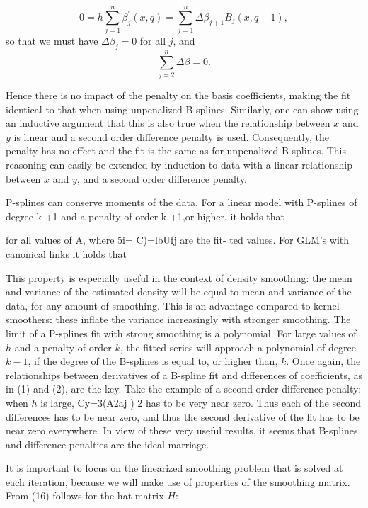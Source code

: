 \documentclass[12pt]{article}
\newcommand*\needsparaphrased{\color{red}}
\begin{document}
\[
0 = h \sum_{j=1}^n \beta^\prime_j\left(x, q\right) = \sum_{j=1}^n \Delta\beta_{j+1} B_j\left(x, q-1\right), 
\]
\noindent
so that we must have $\Delta \beta_j = 0$ for all $j$, and 
\[
\sum_{j=2}^n \Delta \beta = 0.
\]

Hence there is no impact of the penalty on the basis coefficients, making the fit identical to that when using unpenalized B-splines. Similarly, one can show using an inductive argument that this is also true when the relationship between $x$ and $y$ is linear and a second order difference penalty is used. Consequently, the penalty has no effect and the fit is the same as for unpenalized B-splines. This reasoning can easily be extended by induction to data with a linear relationship between $x$ and $y$, and a second order difference penalty. 



P-splines can conserve moments of the data. For a linear model with P-splines of degree k +1 and a penalty of order k +1,or higher, it holds that 

{\needsparaphrased  for all values of A, where 5i= C)=lbUfj are the fit- ted values. For GLM's with canonical links it holds that }

{\needsparaphrased This property is especially useful in the context of density smoothing: the mean and variance of the estimated density will be equal to mean and variance of the data, for any amount of smoothing. This is an advantage compared to kernel smoothers: these inflate the variance increasingly with stronger smoothing. The limit of a P-splines fit with strong smoothing is a polynomial. For large values of $h$ and a penalty of order $k$, the fitted series will approach a polynomial of degree $k-1$, if the degree of the B-splines is equal to, or higher than, $k$. Once again, the relationships between derivatives of a B-spline fit and differences of coefficients, as in (1) and (2), are the key. Take the example of a second-order difference penalty: when $h$ is large, Cy=3(A2aj ) 2 has to be very near zero. Thus each of the second differences has to be near zero, and thus the second derivative of the fit has to be near zero everywhere. In view of these very useful results, it seems that B-splines and difference penalties are the ideal marriage.

It is important to focus on the linearized smoothing problem that is solved at each iteration, because we will make use of properties of the smoothing matrix. From (16) follows for the hat matrix $H$:}
\end{document}
